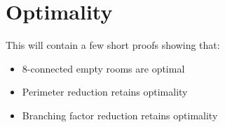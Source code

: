 \section{Optimality}
This will contain a few short proofs showing that:
\begin{itemize}
\item{8-connected empty rooms are optimal}
\item{Perimeter reduction retains optimality}
\item{Branching factor reduction retains optimality}
\end{itemize}
